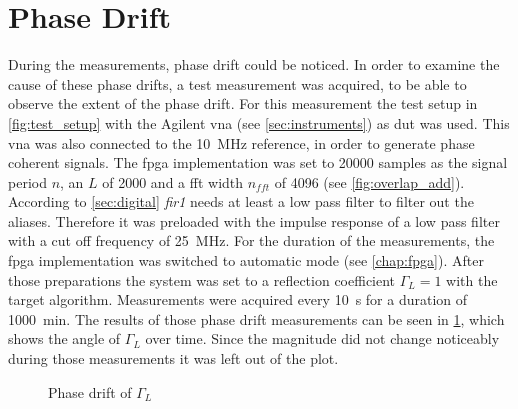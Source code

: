 \documentclass[12pt,a4paper,parskip=full,abstract=true,BCOR=12mm,twoside,open=right]{scrreprt}
\def\device#1{\textit{#1}}
\begin{document}

\section{Phase Drift}
\label{sec:drift}

During the measurements, phase drift could be noticed. In order to examine the
cause of these phase drifts, a test measurement was acquired, to be able
to observe the extent of the phase drift. For this measurement the test setup
in \cref{fig:test_setup} with the Agilent \gls{vna} (see \cref{sec:instruments})
as \gls{dut} was used. This \gls{vna} was also connected to the
\SI{10}{\mega\hertz} reference, in order to generate phase coherent signals. The
\gls{fpga} implementation was set to 20000 samples as the signal period $n$, an $L$
of 2000 and a \gls{fft} width $n_{fft}$ of 4096 (see \cref{fig:overlap_add}).
According to \cref{sec:digital} \device{fir1} needs at least a low pass filter to
filter out the aliases. Therefore it was preloaded with the impulse response of a low pass filter
with a cut off frequency of \SI{25}{\mega\hertz}. For the duration of the measurements,
the \gls{fpga} implementation was switched to automatic mode (see \cref{chap:fpga}). After
those preparations the system was set to a reflection coefficient $\Gamma_L = 1$ with
the target algorithm. Measurements were acquired every \SI{10}{\second} for a duration
of \SI{1000}{\minute}. The results of those phase drift measurements can be seen in
\cref{fig:phase_single}, which shows the angle of $\Gamma_L$ over time. Since the magnitude did not change noticeably during those measurements
it was left out of the plot.

\begin{figure}[htb]
    \centering
    \caption{Phase drift of $\Gamma_L$}
    \label{fig:phase_single}
\end{figure}
\end{document}
